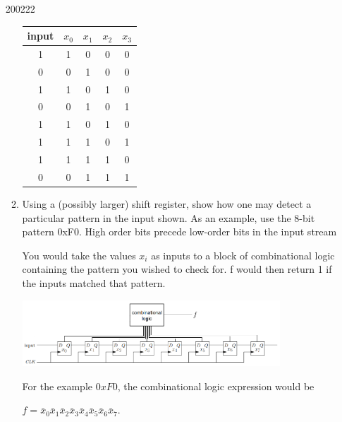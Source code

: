 \documentclass[10pt,\jkfside,a4paper]{article}
\begin{document}
\begin{enumerate}
\begin{examquestion}{2002}{2}{2}
\begin{enumerate}[label=(\alph*)]
\begin{center}
\begin{tabular}{c|c c c c}
input & $x_0$ & $x_1$ & $x_2$ & $x_3$\\
\hline
1 & 1 & 0 & 0 & 0\\
0 & 0 & 1 & 0 & 0\\
1 & 1 & 0 & 1 & 0\\
0 & 0 & 1 & 0 & 1\\
1 & 1 & 0 & 1 & 0\\
1 & 1 & 1 & 0 & 1\\
1 & 1 & 1 & 1 & 0\\
0 & 0 & 1 & 1 & 1\\
\end{tabular}
\end{center}

\item{Using a (possibly larger) shift register, show how one may detect a particular
pattern in the input shown. As an example, use the 8-bit pattern 0xF0. High order bits precede 
low-order bits in the input stream}

You would take the values $x_i$ as inputs to a block of combinational logic containing the pattern 
you wished to check for. f would then return 1 if the inputs matched that pattern.

\begin{center}
\includegraphics[width=0.8\textwidth]{5shift8}
\end{center}

For the example $0xF0$, the combinational logic expression would be

$f = \bar x_0\bar x_1 \bar x_2\bar x_3\bar x_4\bar x_5\bar x_6\bar x_7$.


\end{enumerate}
\end{examquestion}
\end{enumerate}
\end{document}
